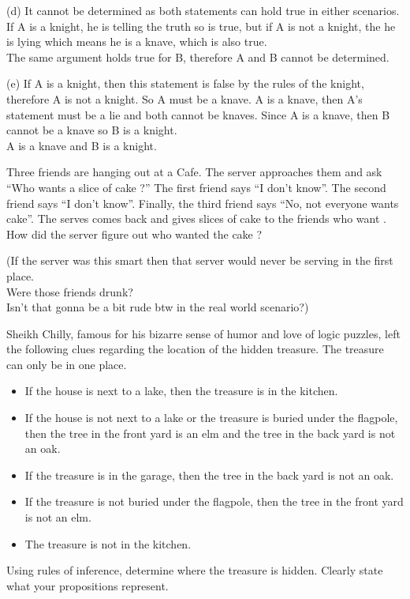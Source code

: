 \documentclass[addpoints]{exam}
\newenvironment{problem}[2][Problem]{\begin{trivlist}
    \item[\hskip \labelsep {\bfseries #1}\hskip \labelsep {\bfseries #2.}]}{\end{trivlist}}
\begin{document}
\begin{sloppypar}
\begin{questions}
\begin{solution}
        (d) It cannot be determined as both statements can hold true in either scenarios. If A is a knight, he is telling the truth so is true, but if A is not a knight, the he is lying which means he is a knave, which is also true. \\ The same argument holds true for B, therefore A and B cannot be determined.

        (e) If A is a knight, then this statement is false by the rules of the knight, therefore A is not a knight. So A must be a knave. A is a knave, then A's statement must be a lie and both cannot be knaves. Since A is a knave, then B cannot be a knave so B is a knight. \\ A is a knave and B is a knight. 
    \end{solution}
\end{questions}

\pagebreak
\begin{problem}{5}
Three friends are hanging out at a Cafe. The server approaches them and ask ``Who wants a slice of cake ?'' The first friend says ``I don't know''.
The second friend says ``I don't know''. Finally, the third friend says ``No, not everyone wants cake''. The serves comes back and gives slices of cake to the
friends who want . How did the server figure out who wanted the cake ? 
\end{problem}
\begin{questions}
    \question
    \begin{solution}

        (If the server was this smart then that server would never be serving in the first place. \\ Were those friends drunk? \\ 
        Isn't that gonna be a bit rude btw in the real world scenario?)
    \end{solution}
\end{questions}

\begin{problem}{6}
Sheikh Chilly, famous for his bizarre sense of humor and love of logic puzzles, left the following clues
regarding the location of the hidden treasure. The treasure can only be in one place.
\begin{itemize}
    \item If the house is next to a lake, then the treasure is in the kitchen.
    \item If the house is not next to a lake or the treasure is buried under the flagpole, then the tree in the front yard is an elm and the tree in the back yard is not an oak.
    \item If the treasure is in the garage, then the tree in the back yard is not an oak.
    \item If the treasure is not buried under the flagpole, then the tree in the front yard is not an elm.
    \item The treasure is not in the kitchen.
\end{itemize}
Using rules of inference, determine where the treasure is hidden. Clearly state what your propositions
represent.
\end{problem}


\end{sloppypar}
\end{document}
